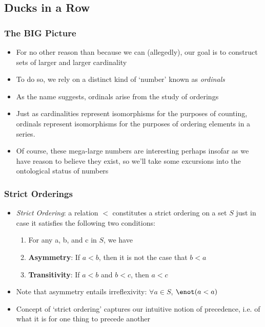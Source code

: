 \subsection{Ducks in a Row}

\begin{frame}
\frametitle{The BIG Picture}

\begin{itemize}[<+->]

\item For no other reason than because we can (allegedly), our goal is to construct sets of larger and larger cardinality

\item To do so, we rely on a distinct kind of `number' known as \textit{ordinals}

\item As the name suggests, ordinals arise from the study of orderings

\item Just as cardinalities represent isomorphisms for the purposes of counting, ordinals represent isomorphisms for the purposes of ordering elements in a series. 

\item Of course, these mega-large numbers are interesting perhaps insofar as we have reason to believe they exist, so we'll take some excursions into the ontological status of numbers

\end{itemize}
\end{frame}

\begin{frame}
\frametitle{Strict Orderings}

\begin{itemize}[<+->]

\item \emph{Strict Ordering}: a relation $<$ constitutes a strict ordering on a set $S$ just in case it satisfies the following two conditions:

\begin{enumerate}

\item[] For any a, b, and c in $S$, we have

\item \textbf{Asymmetry}: If $a < b$, then it is not the case that $b < a$

\item \textbf{Transitivity}: If $a < b $ and $b < c$, then $a < c$

\end{enumerate}

\bigskip 

\item Note that asymmetry entails irreflexivity: $\forall a \in S$, $\enot (a < a)$

\item Concept of `strict ordering' captures our intuitive notion of precedence, i.e. of what it is for one thing to precede another

\end{itemize}
\end{frame}

